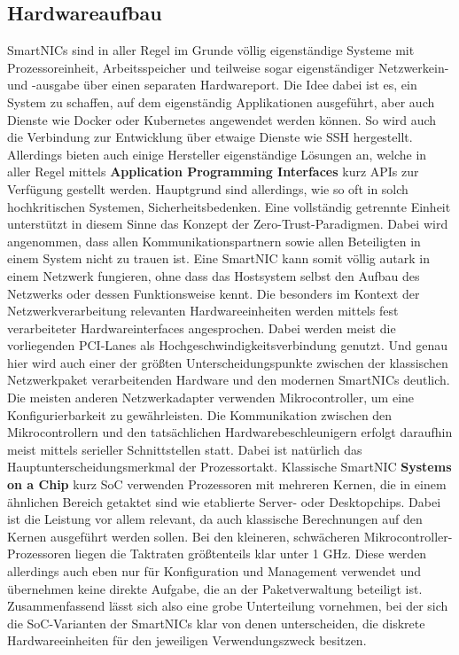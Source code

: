 \subsection{Hardwareaufbau}
SmartNICs sind in aller Regel im Grunde völlig eigenständige Systeme mit Prozessoreinheit, Arbeitsspeicher und teilweise sogar eigenständiger Netzwerkein- und -ausgabe über einen separaten Hardwareport. Die Idee dabei ist es, ein System zu schaffen, auf dem eigenständig Applikationen ausgeführt, aber auch Dienste wie Docker oder Kubernetes angewendet werden können. So wird auch die Verbindung zur Entwicklung über etwaige Dienste wie SSH hergestellt. Allerdings bieten auch einige Hersteller eigenständige Lösungen an, welche in aller Regel mittels \textbf{Application Programming Interfaces} kurz APIs zur Verfügung gestellt werden. Hauptgrund sind allerdings, wie so oft in solch hochkritischen Systemen, Sicherheitsbedenken. Eine vollständig getrennte Einheit unterstützt in diesem Sinne das Konzept der Zero-Trust-Paradigmen. Dabei wird angenommen, dass allen Kommunikationspartnern sowie allen Beteiligten in einem System nicht zu trauen ist. Eine SmartNIC kann somit völlig autark in einem Netzwerk fungieren, ohne dass das Hostsystem selbst den Aufbau des Netzwerks oder dessen Funktionsweise kennt. \cite{whatyouneedtoknowaboutsnics} Die besonders im Kontext der Netzwerkverarbeitung relevanten Hardwareeinheiten werden mittels fest verarbeiteter Hardwareinterfaces angesprochen. Dabei werden meist die vorliegenden PCI-Lanes als Hochgeschwindigkeitsverbindung genutzt. Und genau hier wird auch einer der größten Unterscheidungspunkte zwischen der klassischen Netzwerkpaket verarbeitenden Hardware und den modernen SmartNICs deutlich. Die meisten anderen Netzwerkadapter verwenden Mikrocontroller, um eine Konfigurierbarkeit zu gewährleisten. Die Kommunikation zwischen den Mikrocontrollern und den tatsächlichen Hardwarebeschleunigern erfolgt daraufhin meist mittels serieller Schnittstellen statt. Dabei ist natürlich das Hauptunterscheidungsmerkmal der Prozessortakt. Klassische SmartNIC \textbf{Systems on a Chip} kurz SoC verwenden Prozessoren mit mehreren Kernen, die in einem ähnlichen Bereich getaktet sind wie etablierte Server- oder Desktopchips. Dabei ist die Leistung vor allem relevant, da auch klassische Berechnungen auf den Kernen ausgeführt werden sollen. Bei den kleineren, schwächeren Mikrocontroller-Prozessoren liegen die Taktraten größtenteils klar unter 1 GHz. Diese werden allerdings auch eben nur für Konfiguration und Management verwendet und übernehmen keine direkte Aufgabe, die an der Paketverwaltung beteiligt ist. Zusammenfassend lässt sich also eine grobe Unterteilung vornehmen, bei der sich die SoC-Varianten der SmartNICs klar von denen unterscheiden, die diskrete Hardwareeinheiten für den jeweiligen Verwendungszweck besitzen.
